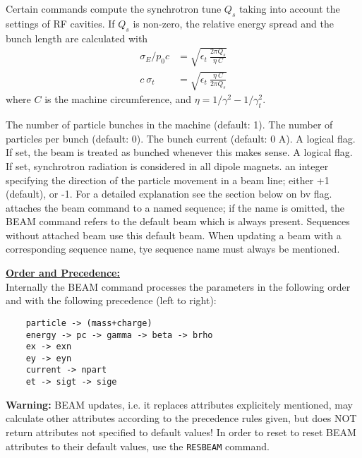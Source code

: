 Certain commands compute the synchrotron tune $Q_s$ taking into account
the settings of RF cavities. 
If $Q_s$ is non-zero, the relative energy spread and 
the bunch length are calculated with
\begin{align*}
\sigma_E / p_0 c  &=  \sqrt{\epsilon_t\ \frac{2 \pi Q_s}{\eta\ C}} \\
  c\ \sigma_t &= \sqrt{\epsilon_t\ \frac{\eta\ C}{2 \pi Q_s}}
\end{align*}
where $C$ is the machine circumference, and 
$\eta = 1/\gamma^2 - 1/\gamma_t^2$.  
\\

\begin{madlist}
   The number of particle bunches in the
  machine (default: 1).  
   \label{beam_npart} The number of particles per bunch (default: 0). 
   The bunch current (default: 0 A). 
   A logical flag. If set, the beam is
  treated as bunched whenever this makes sense.  
   \label{beam_radiate} A logical flag. If set, synchrotron
  radiation is considered in all dipole magnets.  
   an integer specifying the direction of the
  particle movement in a beam line; either +1 (default), or -1. For a
  detailed explanation see the section below on bv flag.  
   attaches the beam command to a named sequence; if
  the name is omitted, the BEAM command refers to the default beam
  which is always present. Sequences without attached beam use this
  default beam. When updating a beam with a corresponding sequence name,
  tye sequence name must always be mentioned.    
\end{madlist} 

{\bf \underline{Order and Precedence:}}\\
Internally the BEAM command processes the parameters in the following
order and with the following precedence (left to right): 
\begin{verbatim}
    particle -> (mass+charge)
    energy -> pc -> gamma -> beta -> brho
    ex -> exn
    ey -> eyn
    current -> npart
    et -> sigt -> sige
\end{verbatim} 


{\bf Warning:} BEAM updates, i.e. it replaces attributes explicitely
mentioned, may calculate other attributes according to the precedence rules
given, but does NOT return attributes not specified to default values! 
In order to reset to reset BEAM attributes to their default values, use
the {\tt RESBEAM} command.


